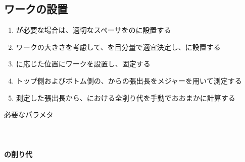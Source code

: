 \subsection{ワークの設置}
\begin{enumerate}[label=\sarrow]
\item \Spacer が必要な場合は、適切なスペーサを\Jig の\ReceiverPlate に設置する
\item {}ワークの大きさを考慮して、\FixtureBoltLength を目分量で適宜決定し、\Jig に設置する
\item \ReAlocationLength に応じた位置にワークを設置し、固定する
\item トップ側およびボトム側の、\Jig からの張出長をメジャーを用いて測定する
\item 測定した張出長から、\EndFacecutMilling における全削り代を手動でおおまかに計算する
\end{enumerate}
\begin{Parameter}{必要なパラメタ}
\paragraph*{\FixtureBolt}
\PMACOD
\PMBDOD\\
\tcbline*
\paragraph*{\EndFacecut の削り代}
\PMJigLength
\PMTopReAlocationLength
\PMBottomReAlocationLength
{}\\
\end{Parameter}


\clearpage
